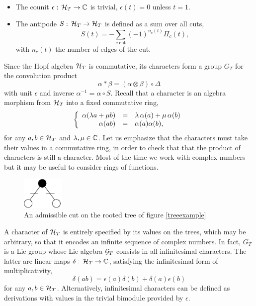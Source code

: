 \documentclass[12pt,here,feynmf]{article}
\begin{document}
\begin{itemize}
\item The counit $\epsilon:\,{\cal H}_{T}\rightarrow{\Bbb C}$ is trivial, $\epsilon(t)=0$ unless $t=1$.

\item
The antipode $S:\,{\cal H}_{T}\rightarrow{\cal H}_{T}$ is defined as a sum over all cuts,
\begin{equation}
S(t)= -\mathop{\sum}\limits_{c\;\mathrm{cut}}
(-1)^{n_{c}(t)}\Pi_{c}(t), \label{antipodetree}
\end{equation}
with $n_{c}(t)$ the number of edges of the cut.
\end{itemize}
Since the Hopf algebra ${\cal H}_{T}$ is commutative, its characters form a  group $G_{T}$ for
the convolution product
\begin{equation}
\alpha\ast\beta=(\alpha\otimes\beta)\circ\Delta
\end{equation}
with unit $\epsilon$ and inverse $\alpha^{-1}=\alpha\circ S$. Recall that a character is an algebra morphism from ${\cal H}_{T}$ into a fixed commutative ring,
\begin{equation}
\left\{
\begin{array}{rcl}
\alpha(\lambda a+\mu b)&=&\lambda\,\alpha(a)+\mu\,\alpha(b)\cr
\alpha(ab)&=&\alpha(a)\alpha(b),
\end{array}
\right.
\end{equation}
for any $a,b\in{\cal H}_{T}$ and $\lambda,\mu\in{\Bbb C}$.   Let us emphasize that the characters must take their values in a commutative ring, in order to check that that the product of characters is still a character. Most of the time we work with complex numbers but it may be useful to consider rings of functions.
 
 
\begin{figure}
\begin{center}
\includegraphics[width=2cm]{t3c.pdf}
\caption{An admissible cut on the rooted tree of figure \ref{treeexample}}
\label{treeexamplecut}
\end{center}
\end{figure}


A character of ${\cal H}_{T}$ is entirely specified by its values on the trees, which may be arbitrary, so that it encodes an infinite sequence of complex numbers. In fact, ${G}_{T}$ is a Lie group whose Lie algebra ${\cal G}_{T}$ consists in all infinitesimal characters. The latter are linear maps $\delta:\,{\cal H}_{T}\rightarrow{\Bbb C}$, satisfying the infinitesimal form of multiplicativity, 
\begin{equation}
\delta(ab)=\epsilon(a)\delta(b)+\delta(a)\epsilon(b)
\end{equation}
for any $a,b\in{\cal H}_{T}$. Alternatively, infinitesimal characters can be defined as derivations with values in the trivial bimodule provided by $\epsilon$.
\end{document}
